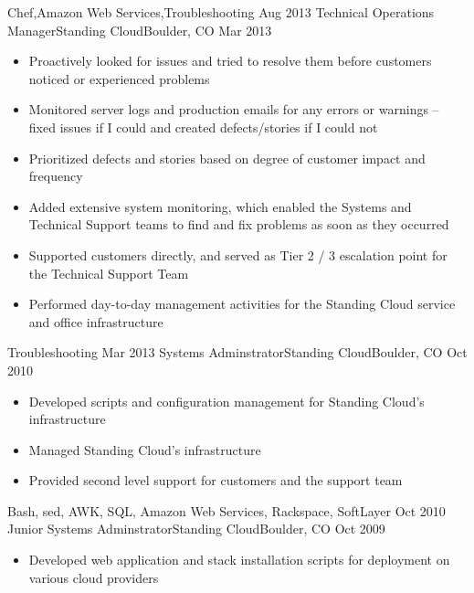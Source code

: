\begin{experiences}
{\begin{itemize}
                      \end{itemize}
                    }
                    {Chef,Amazon Web Services,Troubleshooting}
  \emptySeparator
  \experience
    {Aug 2013}      {Technical Operations Manager}{Standing Cloud}{Boulder, CO}
    {Mar 2013}      {
                      \begin{itemize}
                        \item Proactively looked for issues and tried to resolve them before customers noticed or experienced problems
                        \item Monitored server logs and production emails for any errors or warnings -- fixed issues if I could and created defects/stories if I could not
                        \item Prioritized defects and stories based on degree of customer impact and frequency
                        \item Added extensive system monitoring, which enabled the Systems and Technical Support teams to find and fix problems as soon as they occurred
                        \item Supported customers directly, and served as Tier 2 / 3 escalation point for the Technical Support Team
                        \item Performed day-to-day management activities for the Standing Cloud service and office infrastructure
                      \end{itemize}
                    }
                    {Troubleshooting}
  \emptySeparator
  \experience
    {Mar 2013}      {Systems Adminstrator}{Standing Cloud}{Boulder, CO}
    {Oct 2010}      {
                      \begin{itemize}
                        \item Developed scripts and configuration management for Standing Cloud's infrastructure
                        \item Managed Standing Cloud's infrastructure
                        \item Provided second level support for customers and the support team
                      \end{itemize}
                    }
                    {Bash, sed, AWK, SQL, Amazon Web Services, Rackspace, SoftLayer}
  \emptySeparator
  \experience
    {Oct 2010}      {Junior Systems Adminstrator}{Standing Cloud}{Boulder, CO}
    {Oct 2009}      {
                      \begin{itemize}
                        \item Developed web application and stack installation scripts for deployment on various cloud providers

\end{itemize}}
\end{experiences}

